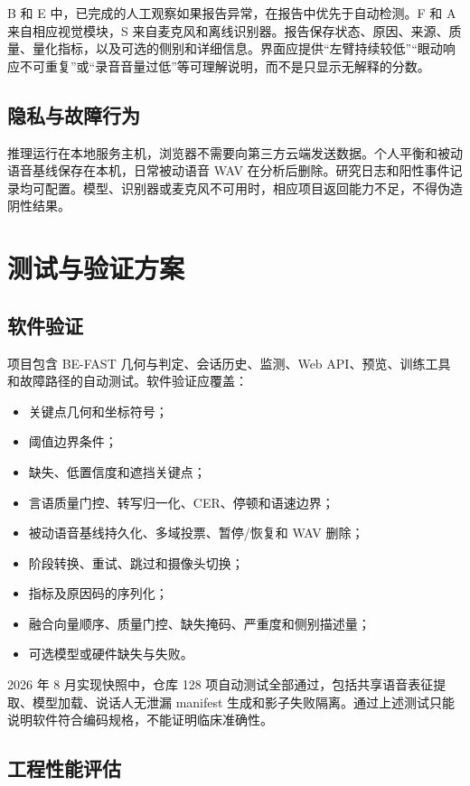 \documentclass[11pt,a4paper]{article}
\begin{document}
B 和 E 中，已完成的人工观察如果报告异常，在报告中优先于自动检测。F 和 A 来自相应视觉模块，S 来自麦克风和离线识别器。报告保存状态、原因、来源、质量、量化指标，以及可选的侧别和详细信息。界面应提供“左臂持续较低”“眼动响应不可重复”或“录音音量过低”等可理解说明，而不是只显示无解释的分数。

\subsection{隐私与故障行为}

推理运行在本地服务主机，浏览器不需要向第三方云端发送数据。个人平衡和被动语音基线保存在本机，日常被动语音 WAV 在分析后删除。研究日志和阳性事件记录均可配置。模型、识别器或麦克风不可用时，相应项目返回能力不足，不得伪造阴性结果。

\section{测试与验证方案}

\subsection{软件验证}

项目包含 BE-FAST 几何与判定、会话历史、监测、Web API、预览、训练工具和故障路径的自动测试。软件验证应覆盖：

\begin{itemize}
  \item 关键点几何和坐标符号；
  \item 阈值边界条件；
  \item 缺失、低置信度和遮挡关键点；
  \item 言语质量门控、转写归一化、CER、停顿和语速边界；
  \item 被动语音基线持久化、多域投票、暂停/恢复和 WAV 删除；
  \item 阶段转换、重试、跳过和摄像头切换；
  \item 指标及原因码的序列化；
  \item 融合向量顺序、质量门控、缺失掩码、严重度和侧别描述量；
  \item 可选模型或硬件缺失与失败。
\end{itemize}

2026 年 8 月实现快照中，仓库 128 项自动测试全部通过，包括共享语音表征提取、模型加载、说话人无泄漏 manifest 生成和影子失败隔离。通过上述测试只能说明软件符合编码规格，不能证明临床准确性。

\subsection{工程性能评估}
\end{document}
